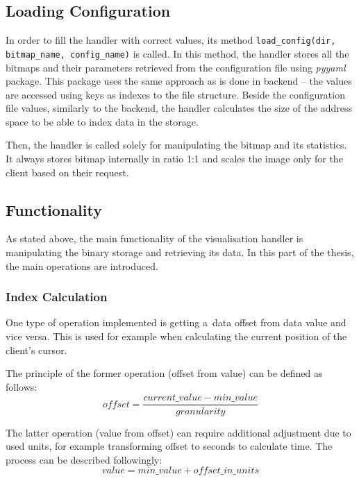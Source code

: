 \subsection{Loading Configuration}\label{sec:loading_config}
In order to fill the handler with correct values, its method \texttt{load\_config(dir, bitmap\_name, config\_\-name)} is
called. In this method, the handler stores all the bitmaps and their parameters retrieved from the configuration
file using \textit{pyyaml} package. This package uses the same approach as is done in backend --
the values are accessed using keys as indexes to the file structure. Beside the configuration file values,
similarly to the backend, the handler calculates the size of the address space to be able to index data in the storage.

Then, the handler is called solely for manipulating the bitmap and its statistics.
It always stores bitmap internally in ratio 1:1 and scales the image only for the client based on
their request.

\subsection{Functionality}\label{sec:handler_functionality}
As stated above, the main functionality of the visualisation handler is manipulating
the binary storage and retrieving its data. In this part of the thesis,
the main operations are introduced.

\subsubsection{Index Calculation}\label{sec:indexing_principles}
One type of operation implemented is getting a~data offset from data value and vice versa. This is used
for example when calculating the current position of the client's cursor.

The principle of the former operation (offset from value) can be defined as follows:
\begin{equation}
   offset = \frac{current\_value - min\_value}{granularity}
\end{equation}

The latter operation (value from offset) can require additional adjustment due to used units, for
example transforming offset to seconds to calculate time. The process can be described followingly:
\begin{equation}
   value = min\_value + offset\_in\_units
\end{equation}

